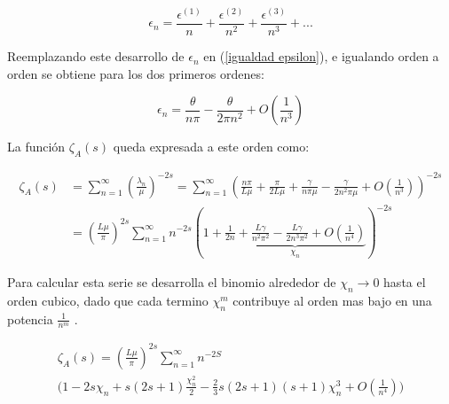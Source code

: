 \begin{equation}
    \epsilon _n = 
    \frac{\epsilon ^{(1)}}{n}  + 
    \frac{\epsilon ^{(2)}}{n ^2}  + 
    \frac{\epsilon ^{(3)}}{n ^3}  + ...
\label{eq.epsilon}
\end{equation}


Reemplazando este desarrollo de $\epsilon _n$ en (\ref{igualdad epsilon}), e igualando orden a orden se obtiene para los dos primeros ordenes:

\begin{equation}
    \epsilon _n = \frac{\theta}{n \pi} 
     - \frac{ \theta}{2 \pi n ^2 } + O \left( \frac{1}{n ^3}\right) 
\label{epsilons}
\end{equation}

\newpage


La función $ \zeta _A (s)$ queda expresada a este orden como:
    
\begin{equation}
\begin{aligned}
    \zeta _{A} (s) &=  
    \sum _{n=1} ^{\infty} 
    \left( \frac{\lambda _n }{\mu} 
    	\right) ^ {-2 s}  =
    \sum _{n=1} ^{\infty} 
    \left(
	\frac{n \pi}{L \mu} + 
    \frac{\pi}{2 L \mu} +
    \frac{\gamma}{n \pi \mu } -
    \frac{\gamma}{2 n ^2 \pi \mu } +
    O \left(  \frac{1}{n^3} \right) 
    \right) ^{-2 s}  \\[5pt]
    &= \left( \frac{L \mu }{\pi} \right) ^{2s}    
    \sum _{n=1} ^{\infty} 
    n ^{- 2 s} 
    \left(
    1 +     
    \underbrace{
        \frac{1}{2 n} + 
        \frac{L \gamma}{n^2 \pi ^2} -
        \frac{L \gamma}{2 n ^3 \pi ^2} +
        O \left( \frac{1}{n ^{4}} \right) } _{ \chi _n}
    \right ) ^{-2 s}
\end{aligned}
\end{equation}

Para calcular esta serie se desarrolla el binomio alrededor de $\chi _n \rightarrow{0} $ hasta el orden cubico, dado que  cada termino $\chi _{n} ^{m} $ contribuye al orden mas bajo en una potencia $\frac{1}{n ^m}$ .

\begin{equation}
\begin{array}{c}
\zeta _{A} (s) = 
( \frac{L \mu }{\pi} ) ^{2s}
\sum _{n=1} ^{\infty}
  n  ^{-2 S} \\[5pt]
\Bigg(
	1 - 
	2 s \chi _n +  s(2s+1) \frac{\chi _n ^2}{2} - 
	\frac{2}{3} s(2s+1)(s+1) \chi _n ^3  + O( \frac{1}{n ^4}) \Bigg)

\end{array}
\end{equation}

